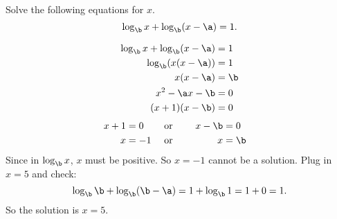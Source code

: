 







Solve the following equations for $x$.
\[
	\log_\b x+\log_\b(x-\a)=1.
\]


\begin{solution}
		\[\begin{split}
		\log_\b x+\log_\b(x-\a)&=1\\
		\log_\b(x(x-\a))&=1\\
		x(x-\a)&=\b\\
		x^2-\a x-\b&=0\\
		(x+1)(x-\b)&=0
		\end{split}
		\]
		\begin{alignat*}{3}
x+1&=0 &&\ctc{or} & x-\b&=0\\
		x&=-1 && \ctc{or} & x&=\b
\end{alignat*}
Since in $\log_\b x$, $x$ must be positive. So $x=-1$ cannot be a solution. Plug in $x=5$ and check:
\[\log_\b\b+\log_\b(\b-\a)=1+\log_\b1=1+0=1.\]
So the solution is $x=5$.
\end{solution}


